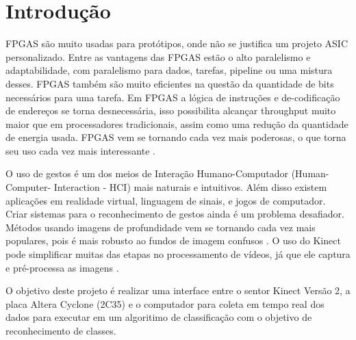 \section{Introdu\c{c}\~ao}

FPGAS são muito usadas para protótipos, onde não se justifica um projeto ASIC
personalizado. Entre as vantagens das FPGAS estão o alto paralelismo e
adaptabilidade, com paralelismo para dados, tarefas, pipeline ou uma mistura
desses. FPGAS também são muito eficientes na questão da quantidade de bits
necessários para uma tarefa. Em FPGAS a lógica de instruções e de-codificação
de endereços se torna desnecessária, isso possibilita alcançar throughput muito
maior que em processadores tradicionais, assim como uma redução da quantidade
de energia usada. FPGAS vem se tornando cada vez mais poderosas, o que torna
seu uso cada vez mais interessante \cite{najjar2003high}.

O uso de gestos é um dos meios de Interação Humano-Computador (Human-Computer-
Interaction - HCI) mais naturais e intuitivos. Além disso existem aplicações em
realidade virtual, linguagem de sinais, e jogos de computador. Criar sistemas
para o reconhecimento de gestos ainda é um problema desafiador. Métodos usando
imagens de profundidade vem se tornando cada vez mais populares, pois é mais
robusto ao fundos de imagem confusos \cite{ren2011robust}. O uso do Kinect pode
simplificar muitas das etapas no processamento de vídeos, já que ele captura e
pré-processa as imagens \cite{Andersson:2014}.

O objetivo deste projeto é realizar uma interface entre o sentor Kinect Versão 2,
a placa Altera Cyclone (2C35) e o computador para coleta em tempo real dos dados para
executar em um algoritimo de classificação com o objetivo de reconhecimento de classes.